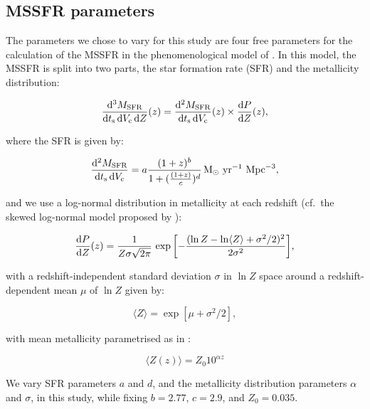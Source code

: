 \documentclass[twocolumn]{aastex631}
\begin{document}
\subsection{MSSFR parameters}\label{sec:method_parameters}

The parameters we chose to vary for this study are four free parameters for the calculation of the \ac{MSSFR} in the phenomenological model of \citet{Neijssel_2019}. In this model, the \ac{MSSFR} is split into two parts, the star formation rate (SFR) and the metallicity distribution:


\begin{equation}
  \frac{\diff^3 \MSFR}{\diff \ts \diff \Vc \diff Z}(z) =
  \frac{\diff^2 \MSFR}{\diff \ts \diff \Vc }(z)
  \times
  \frac{\diff P }{\diff Z}(z),
\end{equation}

\noindent
where the SFR is given by:

\begin{equation}
  \frac{\diff^2 \MSFR}{\diff \ts \diff \Vc} =
  a\frac{(1 + z)^b}{1 + (\frac{(1 + z)}{c})^d}\,
  \mathrm{M}_\odot\ \mathrm{yr}^{-1}\ \mathrm{Mpc}^{-3},
\end{equation}

\bigskip\noindent
and we use a log-normal distribution in metallicity at each redshift (cf.~the skewed log-normal model proposed by \citet{vanSon_2022}):

\begin{equation}
  \frac{\diff P }{\diff Z}(z) =
  \frac{1}{Z\sigma\sqrt{2\pi}}\, \exp\bigg[{-\frac{(\ln Z-\ln \langle Z \rangle +\sigma^2/2)^2}{2\sigma^2}}\bigg],
\end{equation}

\bigskip\noindent
with a redshift-independent standard deviation $\sigma$ in $\ln Z$ space around a redshift-dependent mean $\mu$ of $\ln Z$ given by:

\begin{equation}
  \langle Z \rangle =
  \exp[\mu + \sigma^2/2],
\end{equation}

\bigskip\noindent
with mean metallicity parametrised as in \citet{Langer_2006}:

\begin{equation}
  \langle Z(z) \rangle =
  Z_{0}10^{\alpha{z}}
\end{equation}

\bigskip\noindent
We vary SFR parameters $a$ and $d$, and the metallicity distribution parameters $\alpha$ and $\sigma$, in this study, while fixing $b=2.77$, $c=2.9$, and $Z_0=0.035$.  
\end{document}
